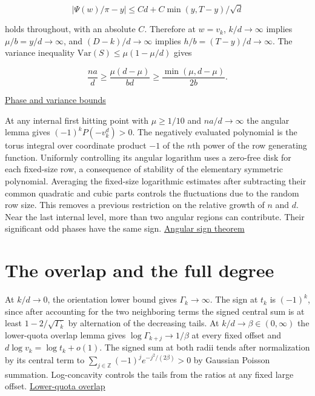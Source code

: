 \begin{equation*}
|\Psi(w)/\pi-y|\le C d+C\min(y,T-y)/\sqrt d
\end{equation*}

holds throughout, with an absolute $C$. Therefore at $w=v_k$, $k/d\to\infty$ implies $\mu/b=y/d\to\infty$, and $(D-k)/d\to\infty$ implies $h/b=(T-y)/d\to\infty$. The variance inequality $\mathrm{Var}(S)\le\mu(1-\mu/d)$ gives

\begin{equation*}
\frac{na}{d}\ge\frac{\mu(d-\mu)}{bd}
\ge\frac{\min(\mu,d-\mu)}{2b}.
\end{equation*}

\href{https://github.com/ProgramComputer/open-math-research/blob/4fb624ba937a8eecc1361a6066185cd81ab7b172/topics/balanced-arrays/quadratic/proof.md}{Phase and variance bounds}

At any internal first hitting point with $\mu\ge1/10$ and $na/d\to\infty$ the angular lemma gives $(-1)^kP(-v_k^d)>0$. The negatively evaluated polynomial is the torus integral over coordinate product $-1$ of the $n$th power of the row generating function. Uniformly controlling its angular logarithm uses a zero-free disk for each fixed-size row, a consequence of stability of the elementary symmetric polynomial. Averaging the fixed-size logarithmic estimates after subtracting their common quadratic and cubic parts controls the fluctuations due to the random row size. This removes a previous restriction on the relative growth of $n$ and $d$. Near the last internal level, more than two angular regions can contribute. Their significant odd phases have the same sign. \hyperref[sec:analytic-angular-signs]{Angular sign theorem}

\section{The overlap and the full degree}

At $k/d\to0$, the orientation lower bound gives $\Gamma_k\to\infty$. The sign at $t_k$ is $(-1)^k$, since after accounting for the two neighboring terms the signed central sum is at least $1-2/\sqrt{\Gamma_k}$ by alternation of the decreasing tails. At $k/d\to\beta\in(0,\infty)$ the lower-quota overlap lemma gives $\log\Gamma_{k+j}\to1/\beta$ at every fixed offset and $d\log v_k=\log t_k+o(1)$. The signed sum at both radii tends after normalization by its central term to $\sum_{j\in\mathbb Z}(-1)^j e^{-j^2/(2\beta)}>0$ by Gaussian Poisson summation. Log-concavity controls the tails from the ratios at any fixed large offset. \hyperref[sec:edgeworth-finite-lower-overlap]{Lower-quota overlap}

